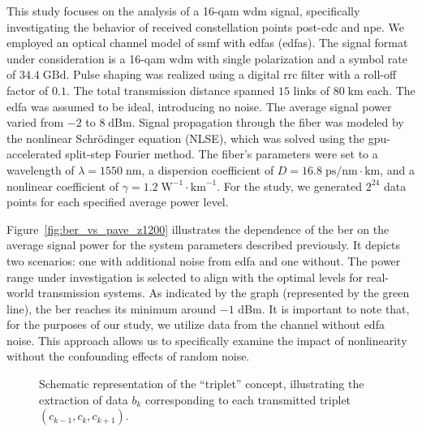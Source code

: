 This study focuses on the analysis of a 16-\acrshort{qam} \acrshort{wdm} signal, specifically investigating the behavior of received constellation points post-\Gls{cdc} and \Gls{npe}.
We employed an optical channel model of \acrfull{ssmf} with \acrlong{edfa}s (\acrshort{edfa}s). The signal format under consideration is a 16-\acrshort{qam} \acrshort{wdm} with single polarization and a symbol rate of \(34.4\; \text{GBd}\). Pulse shaping was realized using a digital \acrfull{rrc} filter with a roll-off factor of \(0.1\). The total transmission distance spanned \(15\) links of \(80\; \text{km}\) each. The \acrshort{edfa} was assumed to be ideal, introducing no noise. The average signal power varied from \(-2\) to \(8\; \text{dBm}\).
Signal propagation through the fiber was modeled by the nonlinear Schrödinger equation (NLSE), which was solved using the \acrshort{gpu}-accelerated split-step Fourier method\cite{esf0_2023_7880552}. The fiber's parameters were set to a wavelength of \(\lambda = 1550\; \text{nm}\), a dispersion coefficient of \(D = 16.8\; \text{ps/nm}\cdot\text{km}\), and a nonlinear coefficient of \(\gamma = 1.2\; \text{W}^{-1}\cdot\text{km}^{-1}\).
For the study, we generated \(2^{24}\) data points for each specified average power level.

Figure~\ref{fig:ber_vs_pave_z1200} illustrates the dependence of the \gls{ber} on the average signal power for the system parameters described previously. It depicts two scenarios: one with additional noise from \gls{edfa} and one without. The power range under investigation is selected to align with the optimal levels for real-world transmission systems. As indicated by the graph (represented by the green line), the \gls{ber} reaches its minimum around \(-1\) dBm. It is important to note that, for the purposes of our study, we utilize data from the channel without \gls{edfa} noise. This approach allows us to specifically examine the impact of nonlinearity without the confounding effects of random noise.


\begin{figure}[h]
    \caption{Schematic representation of the ``triplet'' concept, illustrating the extraction of data \( b_k \) corresponding to each transmitted triplet \( (c_{k-1}, c_k, c_{k+1}) \).
}
    \label{fig:triplet}
\end{figure}

